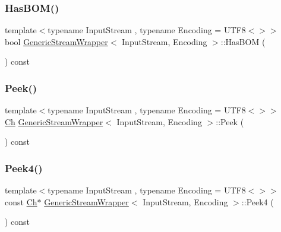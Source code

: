 \mbox{\label{classGenericStreamWrapper_a50f13a9be06f9b29032ca6c655b099ef}} 
\subsubsection{\texorpdfstring{Has\+B\+O\+M()}{HasBOM()}}
{\footnotesize\ttfamily template$<$typename Input\+Stream , typename Encoding  = U\+T\+F8$<$$>$$>$ \\
bool \hyperlink{classGenericStreamWrapper}{Generic\+Stream\+Wrapper}$<$ Input\+Stream, Encoding $>$\+::Has\+B\+OM (\begin{DoxyParamCaption}{ }\end{DoxyParamCaption}) const\hspace{0.3cm}{\ttfamily [inline]}}

\mbox{\label{classGenericStreamWrapper_a98d22642dfdd2626ee25ad1db9fe287e}} 
\subsubsection{\texorpdfstring{Peek()}{Peek()}}
{\footnotesize\ttfamily template$<$typename Input\+Stream , typename Encoding  = U\+T\+F8$<$$>$$>$ \\
\hyperlink{classGenericStreamWrapper_aef9e89bc4997497315bde1b60e8bb848}{Ch} \hyperlink{classGenericStreamWrapper}{Generic\+Stream\+Wrapper}$<$ Input\+Stream, Encoding $>$\+::Peek (\begin{DoxyParamCaption}{ }\end{DoxyParamCaption}) const\hspace{0.3cm}{\ttfamily [inline]}}

\mbox{\label{classGenericStreamWrapper_af86225b2d81fec1ad7321546d5a8669a}} 
\subsubsection{\texorpdfstring{Peek4()}{Peek4()}}
{\footnotesize\ttfamily template$<$typename Input\+Stream , typename Encoding  = U\+T\+F8$<$$>$$>$ \\
const \hyperlink{classGenericStreamWrapper_aef9e89bc4997497315bde1b60e8bb848}{Ch}$\ast$ \hyperlink{classGenericStreamWrapper}{Generic\+Stream\+Wrapper}$<$ Input\+Stream, Encoding $>$\+::Peek4 (\begin{DoxyParamCaption}{ }\end{DoxyParamCaption}) const\hspace{0.3cm}{\ttfamily [inline]}}

